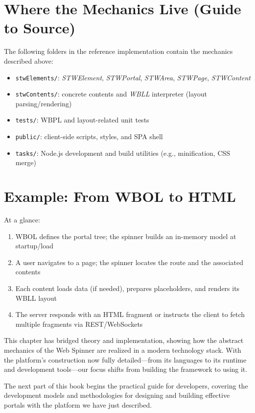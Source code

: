 \section{Where the Mechanics Live (Guide to Source)}
The following folders in the reference implementation contain the mechanics described above:
\begin{itemize}
	\item \texttt{stwElements/}: \textit{STWElement}, \textit{STWPortal}, \textit{STWArea}, \textit{STWPage}, \textit{STWContent}
	\item \texttt{stwContents/}: concrete contents and \textit{WBLL} interpreter (layout parsing/rendering)
	\item \texttt{tests/}: WBPL and layout-related unit tests
	\item \texttt{public/}: client-side scripts, styles, and SPA shell
	\item \texttt{tasks/}: Node.js development and build utilities (e.g., minification, CSS merge)
\end{itemize}

\section{Example: From WBOL to HTML}
At a glance:
\begin{enumerate}
	\item WBOL defines the portal tree; the spinner builds an in-memory model at startup/load
	\item A user navigates to a page; the spinner locates the route and the associated contents
	\item Each content loads data (if needed), prepares placeholders, and renders its WBLL layout
	\item The server responds with an HTML fragment or instructs the client to fetch multiple fragments via REST/WebSockets
\end{enumerate}

\noindent This chapter has bridged theory and implementation, showing how the abstract mechanics of the Web Spinner are realized in a modern technology stack. With the platform's construction now fully detailed—from its languages to its runtime and development tools—our focus shifts from building the framework to using it.

The next part of this book begins the practical guide for developers, covering the development models and methodologies for designing and building effective portals with the platform we have just described.
